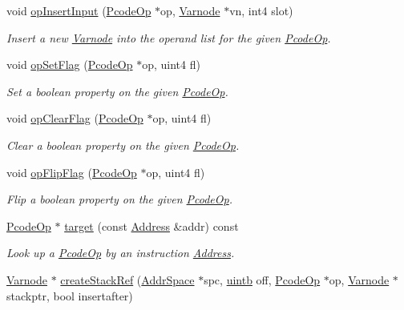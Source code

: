 \begin{DoxyCompactItemize}
void \mbox{\hyperlink{class_funcdata_ab34e641f5ee6f2ebf4aa708e21f2b24c}{op\+Insert\+Input}} (\mbox{\hyperlink{class_pcode_op}{Pcode\+Op}} $\ast$op, \mbox{\hyperlink{class_varnode}{Varnode}} $\ast$vn, int4 slot)
\begin{DoxyCompactList}\small\item\em Insert a new \mbox{\hyperlink{class_varnode}{Varnode}} into the operand list for the given \mbox{\hyperlink{class_pcode_op}{Pcode\+Op}}. \end{DoxyCompactList}\item 
void \mbox{\hyperlink{class_funcdata_a9c3e905343d8d9679b8aad2cde2c4096}{op\+Set\+Flag}} (\mbox{\hyperlink{class_pcode_op}{Pcode\+Op}} $\ast$op, uint4 fl)
\begin{DoxyCompactList}\small\item\em Set a boolean property on the given \mbox{\hyperlink{class_pcode_op}{Pcode\+Op}}. \end{DoxyCompactList}\item 
void \mbox{\hyperlink{class_funcdata_a7241e6861853d664cbcaed94e29fb57e}{op\+Clear\+Flag}} (\mbox{\hyperlink{class_pcode_op}{Pcode\+Op}} $\ast$op, uint4 fl)
\begin{DoxyCompactList}\small\item\em Clear a boolean property on the given \mbox{\hyperlink{class_pcode_op}{Pcode\+Op}}. \end{DoxyCompactList}\item 
void \mbox{\hyperlink{class_funcdata_a6f4a7f3cd801ead4d0bea3b234461eb7}{op\+Flip\+Flag}} (\mbox{\hyperlink{class_pcode_op}{Pcode\+Op}} $\ast$op, uint4 fl)
\begin{DoxyCompactList}\small\item\em Flip a boolean property on the given \mbox{\hyperlink{class_pcode_op}{Pcode\+Op}}. \end{DoxyCompactList}\item 
\mbox{\hyperlink{class_pcode_op}{Pcode\+Op}} $\ast$ \mbox{\hyperlink{class_funcdata_ae15b1cdeaad3e020a732fc31015f4547}{target}} (const \mbox{\hyperlink{class_address}{Address}} \&addr) const
\begin{DoxyCompactList}\small\item\em Look up a \mbox{\hyperlink{class_pcode_op}{Pcode\+Op}} by an instruction \mbox{\hyperlink{class_address}{Address}}. \end{DoxyCompactList}\item 
\mbox{\hyperlink{class_varnode}{Varnode}} $\ast$ \mbox{\hyperlink{class_funcdata_a65e8837c811e309578d2828486bcafb5}{create\+Stack\+Ref}} (\mbox{\hyperlink{class_addr_space}{Addr\+Space}} $\ast$spc, \mbox{\hyperlink{types_8h_a2db313c5d32a12b01d26ac9b3bca178f}{uintb}} off, \mbox{\hyperlink{class_pcode_op}{Pcode\+Op}} $\ast$op, \mbox{\hyperlink{class_varnode}{Varnode}} $\ast$stackptr, bool insertafter)

\end{DoxyCompactItemize}
